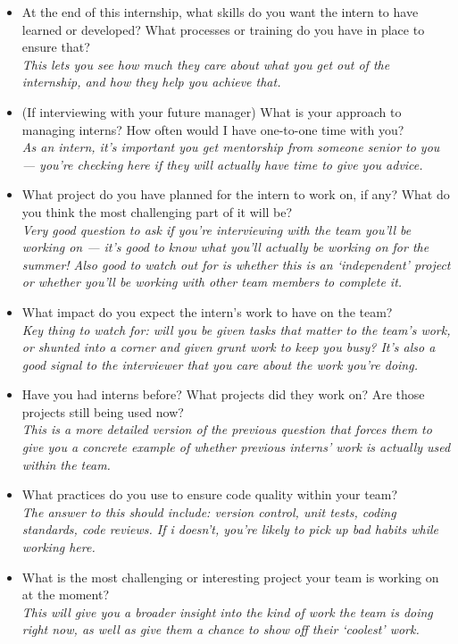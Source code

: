 \begin{itemize}
\item At the end of this internship, what skills do you want the intern to have learned or developed? What processes or training do you have in place to ensure that? \\{\it This lets you see how much they care about what {\it you} get out of the internship, and how they help you achieve that.}
\item (If interviewing with your future manager) What is your approach to managing interns? How often would I have one-to-one time with you? \\{\it As an intern, it's important you get mentorship from someone senior to you --- you're checking here if they will actually have time to give you advice.}
\item What project do you have planned for the intern to work on, if any? What do you think the most challenging part of it will be? \\{\it Very good question to ask if you're interviewing with the team you'll be working on --- it's good to know what you'll actually be working on for the summer! Also good to watch out for is whether this is an `independent' project or whether you'll be working with other team members to complete it.}
\item What impact do you expect the intern's work to have on the team? \\{\it Key thing to watch for: will you be given tasks that matter to the team's work, or shunted into a corner and given grunt work to keep you busy? It's also a good signal to the interviewer that you care about the work you're doing.}
\item Have you had interns before? What projects did they work on? Are those projects still being used now? \\{\it This is a more detailed version of the previous question that forces them to give you a concrete example of whether previous interns' work is actually used within the team. }
\item What practices do you use to ensure code quality within your team? \\{\it The answer to this should include: version control, unit tests, coding standards, code reviews. If i doesn't, you're likely to pick up bad habits while working here.}
\item What is the most challenging or interesting project your team is working on at the moment? \\{\it This will give you a broader insight into the kind of work the team is doing right now, as well as give them a chance to show off their `coolest' work. }

\end{itemize}
